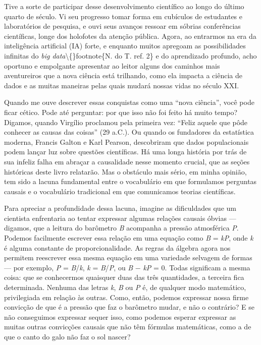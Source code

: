 \documentclass[11pt,a5paper,twoside]{book}
\begin{document}
Tive a sorte de participar desse desenvolvimento científico ao longo do último quarto de século. Vi seu progresso tomar forma em cubículos de estudantes e laboratórios de pesquisa, e ouvi seus avanços ressoar em sóbrias conferências científicas, longe dos holofotes da atenção pública. Agora, ao entrarmos na era da inteligência artificial (IA) forte, e enquanto muitos apregoam as possibilidades infinitas do \textit{big data}\textbackslash\{\}footnote\{N. do T. ref. 2\} e do aprendizado profundo, acho oportuno e empolgante apresentar ao leitor alguns dos caminhos mais aventureiros que a nova ciência está trilhando, como ela impacta a ciência de dados e as muitas maneiras pelas quais mudará nossas vidas no século XXI.

Quando me ouve descrever essas conquistas como uma “nova ciência”, você pode ficar cético. Pode até perguntar: por que isso não foi feito há muito tempo? Digamos, quando Virgílio proclamou pela primeira vez: “Feliz aquele que pôde conhecer as causas das coisas” (29 a.C.). Ou quando os fundadores da estatística moderna, Francis Galton e Karl Pearson, descobriram que dados populacionais podem lançar luz sobre questões científicas. Há uma longa história por trás de sua infeliz falha em abraçar a causalidade nesse momento crucial, que as seções históricas deste livro relatarão. Mas o obstáculo mais sério, em minha opinião, tem sido a lacuna fundamental entre o vocabulário em que formulamos perguntas causais e o vocabulário tradicional em que comunicamos teorias científicas.

Para apreciar a profundidade dessa lacuna, imagine as dificuldades que um cientista enfrentaria ao tentar expressar algumas relações causais óbvias — digamos, que a leitura do barômetro \textit{B} acompanha a pressão atmosférica \textit{P}. Podemos facilmente escrever essa relação em uma equação como \textit{B} = \textit{kP}, onde \textit{k} é alguma constante de proporcionalidade. As regras da álgebra agora nos permitem reescrever essa mesma equação em uma variedade selvagem de formas — por exemplo, \textit{P} = \textit{B}/\textit{k}, \textit{k} = \textit{B}/\textit{P}, ou \textit{B} − \textit{kP} = 0. Todas significam a mesma coisa: que se conhecermos quaisquer duas das três quantidades, a terceira fica determinada. Nenhuma das letras \textit{k}, \textit{B} ou \textit{P} é, de qualquer modo matemático, privilegiada em relação às outras. Como, então, podemos expressar nossa firme convicção de que é a pressão que faz o barômetro mudar, e não o contrário? E se não conseguimos expressar sequer isso, como podemos esperar expressar as muitas outras convicções causais que não têm fórmulas matemáticas, como a de que o canto do galo não faz o sol nascer?
\end{document}
